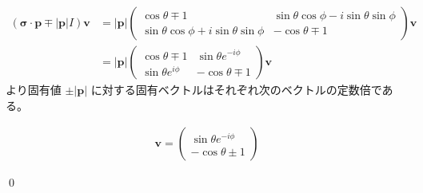 \documentclass[uplatex,dvipdfmx,a4paper,11pt]{jlreq}
\makeatletter
\newcommand{\pp}{\bm{p}}
\numberwithin{equation}{section}
\theoremstyle{definition}
\renewenvironment{proof}[1][\proofname]{\par
  \normalfont
  \topsep6\p@\@plus6\p@ \trivlist
  \item[\hskip\labelsep{\bfseries #1}\@addpunct{\bfseries}]\ignorespaces\quad\par
}{%
  \qed\endtrivlist\@endpefalse
}
\renewcommand\proofname{証明}
\makeatother
\begin{document}
\begin{proof}
  \begin{align}
    (\bm{\sigma}\cdot\pp \mp |\pp|I)\bm{v} & = |\pp|\begin{pmatrix}
                                                      \cos\theta \mp 1                         & \sin\theta\cos\phi - i\sin\theta\sin\phi \\
                                                      \sin\theta\cos\phi + i\sin\theta\sin\phi & -\cos\theta \mp 1
                                                    \end{pmatrix}\bm{v} \\
                                           & = |\pp|\begin{pmatrix}
                                                      \cos\theta \mp 1     & \sin\theta e^{-i\phi} \\
                                                      \sin\theta e^{i\phi} & -\cos\theta \mp 1
                                                    \end{pmatrix}\bm{v}
  \end{align}
  より固有値 $\pm|\pp|$ に対する固有ベクトルはそれぞれ次のベクトルの定数倍である。

  \begin{align}
    \bm{v} = \begin{pmatrix}
               \sin\theta e^{-i\phi} \\
               -\cos\theta \pm 1
             \end{pmatrix}
  \end{align}

\end{proof}
\end{document}
